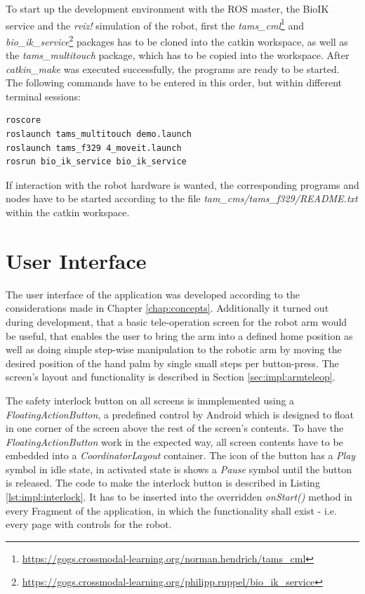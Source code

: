 To start up the development environment with the ROS master, the BioIK service and the \textit{rviz!} simulation of the robot, first the \textit{tams\_cml}\footnote{\url{https://gogs.crossmodal-learning.org/norman.hendrich/tams_cml}} and \textit{bio\_ik\_service}\footnote{\url{https://gogs.crossmodal-learning.org/philipp.ruppel/bio_ik_service}} packages has to be cloned into the catkin workspace, as well as the \textit{tams\_multitouch} package, which has to be copied into the workspace. After \textit{catkin\_make} was executed successfully, the programs are ready to be started. The following commands have to be entered in this order, but within different terminal sessions:
\begin{lstlisting}[caption={Commands to start up the development environment}]
roscore
roslaunch tams_multitouch demo.launch
roslaunch tams_f329 4_moveit.launch
rosrun bio_ik_service bio_ik_service
\end{lstlisting}

If interaction with the robot hardware is wanted, the corresponding programs and nodes have to be started according to the file \textit{tam\_cms/tams\_f329/README.txt} within the catkin workspace.

\section{User Interface}
\label{sec:impl:ui}

The user interface of the application was developed according to the considerations made in Chapter \ref{chap:concepts}. Additionally it turned out during development, that a basic tele-operation screen for the robot arm would be useful, that enables the user to bring the arm into a defined home position as well as doing simple step-wise manipulation to the robotic arm by moving the desired position of the hand palm by single small steps per button-press. The screen's layout and functionality is described in Section \ref{sec:impl:armteleop}.

The safety interlock button on all screens is immplemented using a \textit{FloatingActionButton}, a predefined control by Android which is designed to float in one corner of the screen above the rest of the screen's contents. To have the \textit{FloatingActionButton} work in the expected way, all screen contents have to be embedded into a \textit{CoordinatorLayout} container. The icon of the button has a \textit{Play} symbol in idle state, in activated state is shows a \textit{Pause} symbol until the button is released. The code to make the interlock button is described in Listing \ref{lst:impl:interlock}. It has to be inserted into the overridden \textit{onStart()} method in every Fragment of the application, in which the functionality shall exist - i.e. every page with controls for the robot.

